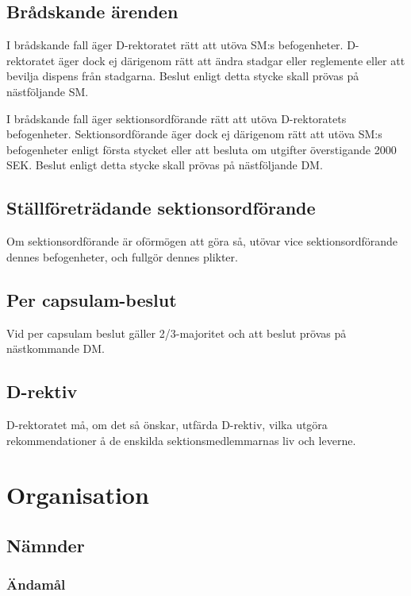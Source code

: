 \documentclass[a4paper,12pt]{article}
\begin{document}
\subsection{Brådskande ärenden}

I brådskande fall äger D-rektoratet rätt att utöva SM:s befogenheter. D-rektoratet äger dock ej därigenom rätt att ändra stadgar eller reglemente eller att bevilja dispens från stadgarna. Beslut enligt detta stycke skall prövas på nästföljande SM.

I brådskande fall äger sektionsordförande rätt att utöva D-rektoratets befogenheter. Sektionsordförande äger dock ej därigenom rätt att utöva SM:s befogenheter enligt första stycket eller att besluta om utgifter överstigande 2000 SEK. Beslut enligt detta stycke skall prövas på nästföljande DM.

\subsection{Ställföreträdande sektionsordförande}

Om sektionsordförande är oförmögen att göra så, utövar vice sektionsordförande dennes befogenheter, och fullgör dennes plikter.

\subsection{Per capsulam-beslut}

Vid per capsulam beslut gäller 2/3-majoritet och att beslut prövas på nästkommande DM.

\subsection{D-rektiv}

D-rektoratet må, om det så önskar, utfärda D-rektiv, vilka utgöra rekommendationer å de enskilda sektionsmedlemmarnas liv och leverne.

\section{Organisation}

\subsection{Nämnder}
\label{sec:namnder}

\subsubsection{Ändamål}
\end{document}
